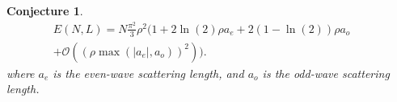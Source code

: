 \documentclass[final]{beamer}
\newcommand{\abs}[1]{\left\lvert #1 \right\rvert}
\newtheorem{mconjecture}{Conjecture}
\newlength{\sepwidth}
\newlength{\colwidth}
\newcommand{\separatorcolumn}{\begin{column}{\sepwidth}\end{column}}
\begin{document}
\begin{frame}[t]
\begin{columns}[t]
\begin{column}{\colwidth}
\begin{tcolorbox}[colframe=qmathblue,colback=qmathbluelyslyslys,title=Spin-1/2 conjecture]
\begin{mconjecture}
			\begin{equation}
			\begin{aligned}
			E(N,L)=N\frac{\pi^2}{3}\rho^2\Big(1+2\ln(2)\rho a_e+2(1-\ln(2))\rho a_o\\+\mathcal{O}\left((\rho\max(\abs{a_e},a_o))^2\right)\Big).
			\end{aligned}
			\end{equation}
			where $ a_e $ is the even-wave scattering length, and $a_o$ is the odd-wave scattering length.
		\end{mconjecture}
	\end{tcolorbox}\vspace{0.75cm}
	\begin{tcolorbox}[colframe=qmathblue,colback=qmathbluelyslyslys,title=References]
		\vspace*{0 cm}
		
		{\fontsize{15}{18}\selectfont}
		\vspace*{0 cm}
	\end{tcolorbox}\vspace{0.75cm}
	\end{column}	
	\separatorcolumn
	\end{columns}
	\end{frame}
\end{document}
